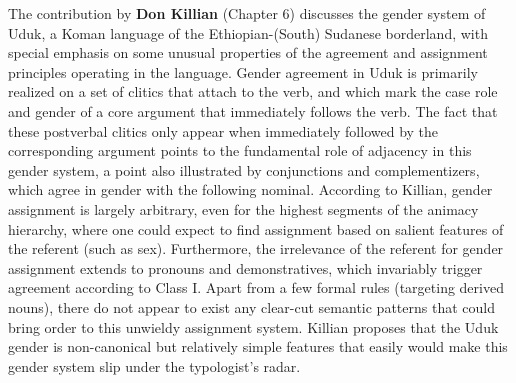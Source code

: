 \documentclass[output=collectionpaper]{langsci/langscibook}
\begin{document}
The contribution by \textbf{Don Killian} (Chapter 6) discusses the gender system of Uduk, a Koman language of the Ethiopian-(South) Sudanese borderland, with special emphasis on some unusual properties of the agreement and assignment principles operating in the language. Gender agreement in Uduk is primarily realized on a set of clitics that attach to the verb, and which mark the case role and gender of a core argument that immediately follows the verb. The fact that these postverbal clitics only appear when immediately followed by the corresponding argument points to the fundamental role of adjacency in this gender system, a point also illustrated by conjunctions and complementizers, which agree in gender with the following nominal. According to Killian, gender assignment is largely arbitrary, even for the highest segments of the animacy hierarchy, where one could expect to find assignment based on salient features of the referent (such as sex). Furthermore, the irrelevance of the referent for gender assignment extends to pronouns and demonstratives, which invariably trigger agreement according to Class I. Apart from a few formal rules (targeting derived nouns), there do not appear to exist any clear-cut semantic patterns that could bring order to this unwieldy assignment system. Killian proposes that the Uduk gender is non-canonical but relatively simple \textendash{} features that easily would make this gender system slip under the typologist’s radar.
\end{document}
